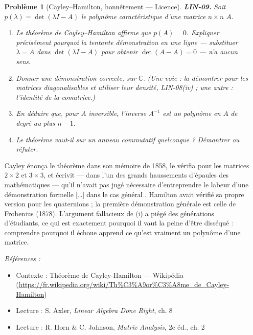 \documentclass[11pt]{article}
\newtheorem{problem}{Problème}
\newenvironment{refs}{\par\small\noindent\emph{Références :}\begin{itemize}\setlength\itemsep{0pt}}{\end{itemize}\normalsize}
\begin{document}
\bigskip

\begin{problem}[{Cayley--Hamilton, honnêtement --- Licence}]
\textbf{LIN-09.} Soit $p(\lambda) = \det(\lambda I - A)$ le
polynôme caractéristique d'une matrice $n \times n$ $A$.
\begin{enumerate}
\item[(i)] Le théorème de Cayley--Hamilton
affirme que $p(A) = 0$. Expliquer précisément pourquoi la tentante \og{} démonstration \fg{} en une ligne
--- substituer $\lambda = A$ dans $\det(\lambda I - A)$ pour obtenir $\det(A - A) = 0$ --- n'a
aucun sens.
\item[(ii)] Donner une démonstration correcte, sur $\mathbb{C}$. (Une voie : la démontrer pour les matrices
diagonalisables et utiliser leur densité, LIN-08(iv) ; une autre : l'identité de la comatrice.)
\item[(iii)] En déduire que, pour $A$ inversible, l'inverse $A^{-1}$ est un polynôme en $A$ de degré au
plus $n - 1$.
\item[(iv)] Le théorème vaut-il sur un anneau commutatif quelconque ? Démontrer ou
réfuter.
\end{enumerate}

\end{problem}

\noindent Cayley énonça le théorème dans son mémoire de 1858, le vérifia pour les matrices
$2 \times 2$ et $3 \times 3$, et écrivit --- dans l'un des grands haussements d'épaules des
mathématiques --- qu'il n'avait \og{} pas jugé nécessaire d'entreprendre le labeur d'une démonstration
formelle [\dots{}] dans le cas général \fg{}. Hamilton avait vérifié sa propre version pour les quaternions ;
la première démonstration générale est celle de Frobenius (1878). L'argument fallacieux de (i) a
piégé des générations d'étudiants, ce qui est exactement pourquoi il vaut la peine d'être disséqué :
comprendre pourquoi il échoue apprend ce qu'est vraiment un polynôme d'une matrice.

\begin{refs}
\item Contexte : Théorème de Cayley-Hamilton --- Wikipédia (\url{https://fr.wikipedia.org/wiki/Th%C3%A9or%C3%A8me_de_Cayley-Hamilton})
\item Lecture : S. Axler, \textit{Linear Algebra Done Right}, ch. 8
\item Lecture : R. Horn \& C. Johnson, \textit{Matrix Analysis}, 2e éd., ch. 2
\end{refs}
\end{document}
